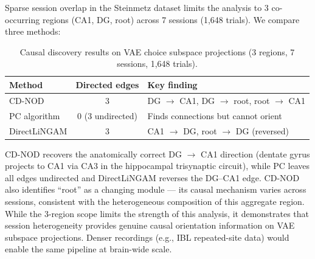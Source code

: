 \documentclass{article}
\begin{document}
Sparse session overlap in the Steinmetz dataset limits the analysis to 3 co-occurring regions (CA1, DG, root) across 7 sessions (1,648 trials). We compare three methods:

\begin{table}[h]
\centering
\caption{Causal discovery results on VAE choice subspace projections (3 regions, 7 sessions, 1,648 trials).}
\label{tab:cdnod}
\small
\begin{tabular}{lcl}
\toprule
\textbf{Method} & \textbf{Directed edges} & \textbf{Key finding} \\
\midrule
CD-NOD         & 3 & DG $\to$ CA1, DG $\to$ root, root $\to$ CA1 \\
PC algorithm   & 0 (3 undirected) & Finds connections but cannot orient \\
DirectLiNGAM   & 3 & CA1 $\to$ DG, root $\to$ DG (reversed) \\
\bottomrule
\end{tabular}
\end{table}

CD-NOD recovers the anatomically correct DG $\to$ CA1 direction (dentate gyrus projects to CA1 via CA3 in the hippocampal trisynaptic circuit), while PC leaves all edges undirected and DirectLiNGAM reverses the DG--CA1 edge. CD-NOD also identifies ``root'' as a changing module --- its causal mechanism varies across sessions, consistent with the heterogeneous composition of this aggregate region. While the 3-region scope limits the strength of this analysis, it demonstrates that session heterogeneity provides genuine causal orientation information on VAE subspace projections. Denser recordings (e.g., IBL repeated-site data) would enable the same pipeline at brain-wide scale.
\end{document}
